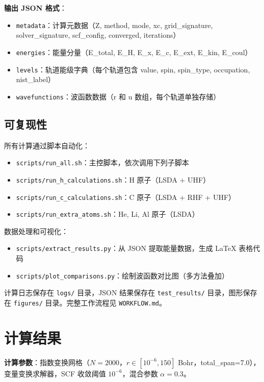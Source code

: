 \documentclass[12pt,a4paper]{article}
\begin{document}
\textbf{输出 JSON 格式}：
\begin{itemize}
    \item \texttt{metadata}：计算元数据（Z, method, mode, xc, grid\_signature, solver\_signature, scf\_config, converged, iterations）
    \item \texttt{energies}：能量分量（E\_total, E\_H, E\_x, E\_c, E\_ext, E\_kin, E\_coul）
    \item \texttt{levels}：轨道能级字典（每个轨道包含 value, spin, spin\_type, occupation, nist\_label）
    \item \texttt{wavefunctions}：波函数数据（r 和 u 数组，每个轨道单独存储）
\end{itemize}

\subsection{可复现性}

所有计算通过脚本自动化：
\begin{itemize}
    \item \texttt{scripts/run\_all.sh}：主控脚本，依次调用下列子脚本
    \item \texttt{scripts/run\_h\_calculations.sh}：H 原子（LSDA + UHF）
    \item \texttt{scripts/run\_c\_calculations.sh}：C 原子（LSDA + RHF + UHF）
    \item \texttt{scripts/run\_extra\_atoms.sh}：He, Li, Al 原子（LSDA）
\end{itemize}

数据处理和可视化：
\begin{itemize}
    \item \texttt{scripts/extract\_results.py}：从 JSON 提取能量数据，生成 LaTeX 表格代码
    \item \texttt{scripts/plot\_comparisons.py}：绘制波函数对比图（多方法叠加）
\end{itemize}

计算日志保存在 \texttt{logs/} 目录，JSON 结果保存在 \texttt{test\_results/} 目录，图形保存在 \texttt{figures/} 目录。完整工作流程见 \texttt{WORKFLOW.md}。

\section{计算结果}

\textbf{计算参数}：指数变换网格（$N=2000$，$r\in[10^{-6}, 150]$ Bohr，total\_span=7.0），变量变换求解器，SCF 收敛阈值 $10^{-6}$，混合参数 $\alpha=0.3$。
\end{document}

